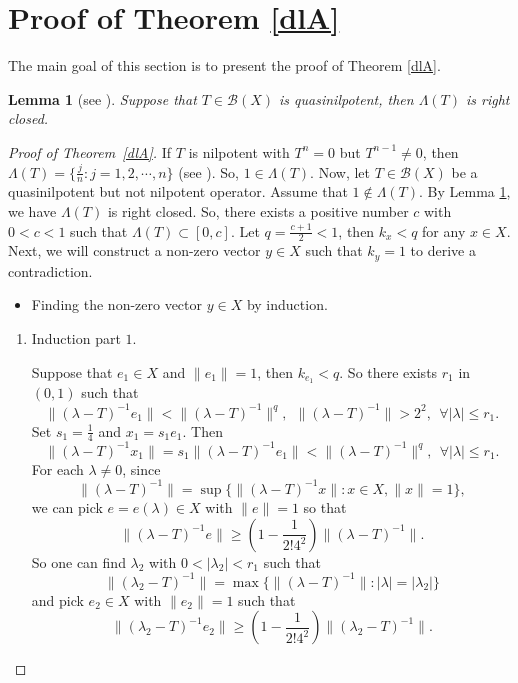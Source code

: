 \documentclass[12pt]{amsart}
\numberwithin{equation}{section}
\theoremstyle{plain}
\newtheorem{lem}[thm]{Lemma}
\theoremstyle{definition}
\newcommand{\B}{{\mathcal{B}}}
\begin{document}
\section{Proof of Theorem \ref{dlA}}
The main goal of this section is to present the proof of Theorem \ref{dlA}.
\begin{lem}[see \cite{HuJi2025}]\label{RClosed}
Suppose that $T\in\mathcal{B}(X)$ is quasinilpotent, then $\Lambda(T)$ is right closed.
\end{lem}

\begin{proof}[Proof of Theorem~\ref{dlA}]
If $T$ is nilpotent with $T^n=0$ but $T^{n-1}\neq0$, then $\Lambda(T)=\{\frac{j}{n}:j=1,2,\cdots,n\}$ (see \cite[Example 6.1]{DY3}).
So, $1\in \Lambda(T)$.
Now, let $T\in\B(X)$ be a quasinilpotent but not nilpotent operator.
Assume that $1\notin \Lambda(T)$.
By Lemma \ref{RClosed}, we have $\Lambda(T)$ is right closed.
So, there exists a positive number $c$ with $0<c<1$ such that $\Lambda(T)\subset [0,c]$.
Let $q=\frac{c+1}{2}<1$, then $k_x<q$ for any $x\in X$.
Next, we will construct a non-zero vector $y\in X$ such that $k_y=1$ to derive a contradiction.

\begin{itemize}
  \item [\textbf{STEP 1.}] Finding the non-zero vector $y\in X$ by induction.
\end{itemize}
\begin{enumerate}
  \item [(1)] Induction part $1$.

  Suppose that $e_1\in X$ and $\|e_1\|=1$, then $k_{e_1}<q$.
  So there exists $r_1$ in $(0,1)$ such that
  $$\|(\lambda-T)^{-1}e_1\|<\|(\lambda-T)^{-1}\|^q, \ \  \|(\lambda-T)^{-1}\|>2^2, \ \ \forall |\lambda|\leq r_1.$$
  Set $s_1=\frac{1}{4}$ and $x_1=s_1e_1$.
  Then
  $$\|(\lambda-T)^{-1}x_1\|=s_1\|(\lambda-T)^{-1}e_1\|<\|(\lambda-T)^{-1}\|^q,\ \ \forall |\lambda|\leq r_1.$$
  For each $\lambda\neq 0$, since
  $$\|(\lambda-T)^{-1}\|=\sup\{\|(\lambda-T)^{-1}x\|: x\in X,\|x\|=1\},$$
  we can pick $e=e(\lambda)\in X$ with $\|e\|=1$ so that
  $$\|(\lambda-T)^{-1}e\|\geq (1-\frac{1}{2!4^2})\|(\lambda-T)^{-1}\|.$$
  So one can find $\lambda_2$ with $0<|\lambda_2|<r_1$ such that
  $$\|(\lambda_2-T)^{-1}\|=\max\{\|(\lambda-T)^{-1}\|:|\lambda|=|\lambda_2|\}$$
  and pick $e_2\in X$ with $\|e_2\|=1$ such that
  $$\|(\lambda_2-T)^{-1}e_2\|\geq(1-\frac{1}{2!4^2})\|(\lambda_2-T)^{-1}\|.$$


\end{enumerate}
\end{proof}
\end{document}
